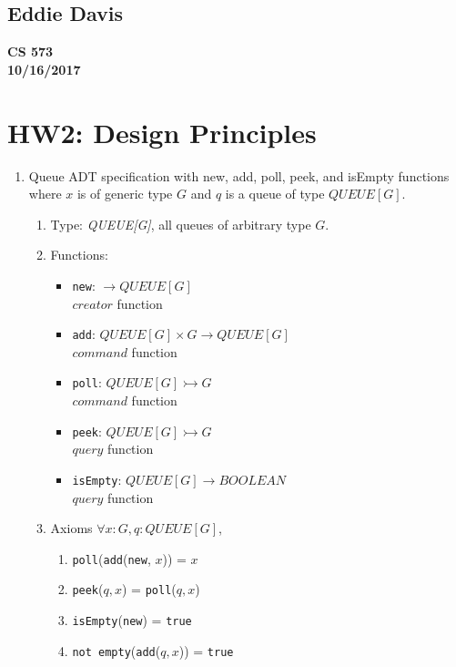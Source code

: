 \documentclass{report}
\begin{document}
\subsection*{Eddie Davis}
\textbf{CS 573}\\
\textbf{10/16/2017}\\

\section*{HW2: Design Principles}

\begin{enumerate}
	\item Queue ADT specification with new, add, poll, peek, and isEmpty functions
	where $x$ is of generic type $G$ and $q$ is a queue of type $QUEUE[G]$.
	
	\begin{enumerate}
		\item Type: \textit{QUEUE[G]}, all queues of arbitrary type $G$.
		\item Functions:
		\begin{itemize}
			\item \texttt{new}: $\rightarrow QUEUE[G]$ \\
			$creator$ function
			\item \texttt{add}: $QUEUE[G] \times G \rightarrow QUEUE[G]$ \\
			$command$ function
			\item \texttt{poll}: $QUEUE[G] \rightarrowtail G$ \\
			$command$ function			
			\item \texttt{peek}: $QUEUE[G] \rightarrowtail G$ \\
    		$query$ function
			\item \texttt{isEmpty}: $QUEUE[G] \rightarrow BOOLEAN$ \\
    		$query$ function			
		\end{itemize}
		
		\item Axioms		
		$\forall x:G, q:QUEUE[G]$,
			\begin{enumerate}
				\item \texttt{poll}(\texttt{add}(\texttt{new}, $x$)) = $x$
				\item \texttt{peek}($q, x$) = \texttt{poll}($q, x$)
				\item \texttt{isEmpty}(\texttt{new}) = \texttt{true}
				\item \texttt{not empty}(\texttt{add}($q, x$)) = \texttt{true}
        	\end{enumerate}		


\end{enumerate}
\end{enumerate}
\end{document}

